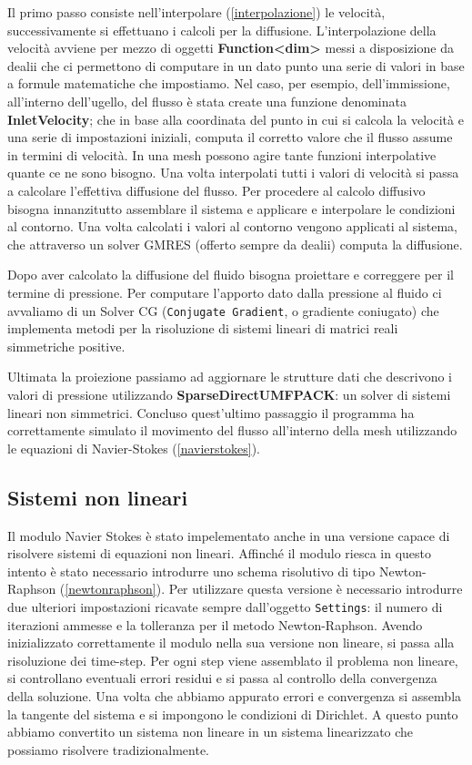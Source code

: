         Il primo passo consiste nell'interpolare (\ref*{interpolazione}) le velocità, successivamente si effettuano i calcoli per la diffusione.
        L'interpolazione della velocità avviene per mezzo di oggetti \textbf{Function<dim>} messi a disposizione da dealii che ci permettono di computare in un dato punto una serie di valori in base a
        formule matematiche che impostiamo. Nel caso, per esempio, dell'immissione, all'interno dell'ugello, del flusso è stata create una funzione denominata \textbf{InletVelocity}; che in base alla coordinata
        del punto in cui si calcola la velocità e una serie di impostazioni iniziali, computa il corretto valore che il flusso assume in termini di velocità.
        In una mesh possono agire tante funzioni interpolative quante ce ne sono bisogno. Una volta interpolati tutti i valori di velocità si passa a calcolare l'effettiva diffusione del flusso.
        Per procedere al calcolo diffusivo bisogna innanzitutto assemblare il sistema e applicare e interpolare le condizioni al contorno.
        Una volta calcolati i valori al contorno vengono applicati al sistema, che attraverso un solver GMRES (offerto sempre da dealii) computa la diffusione.

        Dopo aver calcolato la diffusione del fluido bisogna proiettare e correggere per il termine di pressione. Per computare l'apporto dato dalla pressione al fluido
        ci avvaliamo di un Solver CG (\texttt{Conjugate Gradient}, o gradiente coniugato) che implementa metodi per la risoluzione di sistemi lineari di matrici reali simmetriche positive.

        Ultimata la proiezione passiamo ad aggiornare le strutture dati che descrivono i valori di pressione utilizzando \textbf{SparseDirectUMFPACK}: un solver di sistemi lineari non simmetrici.
        Concluso quest'ultimo passaggio il programma ha correttamente simulato il movimento del flusso all'interno della mesh utilizzando le equazioni di Navier-Stokes (\ref*{navierstokes}).
        \subsection{Sistemi non lineari}
        Il modulo Navier Stokes è stato impelementato anche in una versione capace di risolvere sistemi di equazioni non lineari.
        Affinché il modulo riesca in questo intento è stato necessario introdurre uno schema risolutivo di tipo Newton-Raphson (\ref*{newtonraphson}).
        Per utilizzare questa versione è necessario introdurre due ulteriori impostazioni ricavate sempre dall'oggetto \texttt{Settings}: il numero di iterazioni 
        ammesse e la tolleranza per il metodo Newton-Raphson. 
        Avendo inizializzato correttamente il modulo nella sua versione non lineare, si passa alla risoluzione dei time-step. Per ogni step viene assemblato il problema non lineare, si controllano eventuali
        errori residui e si passa al controllo della convergenza della soluzione. Una volta che abbiamo appurato errori e convergenza si assembla la tangente del sistema e si impongono le condizioni di Dirichlet.
        A questo punto abbiamo convertito un sistema non lineare in un sistema linearizzato che possiamo risolvere tradizionalmente. 
